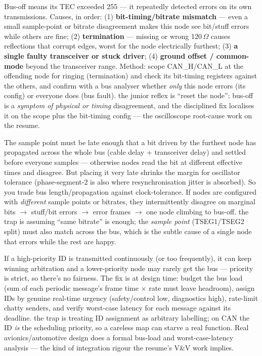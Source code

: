 Bus-off means its TEC exceeded 255 --- it repeatedly detected errors on its own
transmissions. Causes, in order: (1) \textbf{bit-timing/bitrate mismatch} ---
even a small sample-point or bitrate disagreement makes this node see bit/stuff
errors while others are fine; (2) \textbf{termination} --- missing or wrong
120\,$\Omega$ causes reflections that corrupt edges, worst for the node
electrically furthest; (3) \textbf{a single faulty transceiver or stuck
driver}; (4) \textbf{ground offset / common-mode} beyond the transceiver range.
Method: scope CAN\_H/CAN\_L at the offending node for ringing (termination) and
check its bit-timing registers against the others, and confirm with a bus
analyser whether \emph{only} this node errors (its config) or everyone does (bus
fault). \trap the junior reflex is ``reset the node''; bus-off is a \emph{symptom
of physical or timing} disagreement, and the disciplined fix localises it on the
scope plus the bit-timing config --- the oscilloscope root-cause work on the
resume.

The sample point must be late enough that a bit driven by the furthest node has
propagated across the whole bus (cable delay + transceiver delay) and settled
before everyone samples --- otherwise nodes read the bit at different effective
times and disagree. But placing it very late shrinks the margin for oscillator
tolerance (phase-segment-2 is also where resynchronisation jitter is absorbed).
So you trade bus length/propagation against clock-tolerance. If nodes are
configured with \emph{different} sample points or bitrates, they intermittently
disagree on marginal bits $\rightarrow$ stuff/bit errors $\rightarrow$ error
frames $\rightarrow$ one node climbing to bus-off. \trap the trap is assuming
``same bitrate'' is enough; the \emph{sample point} (TSEG1/TSEG2 split) must
also match across the bus, which is the subtle cause of a single node that
errors while the rest are happy.

If a high-priority ID is transmitted continuously (or too frequently), it can
keep winning arbitration and a lower-priority node may rarely get the bus ---
priority is strict, so there's no fairness. The fix is at design time: budget the
bus load (sum of each periodic message's frame time $\times$ rate must leave
headroom), assign IDs by genuine real-time urgency (safety/control low,
diagnostics high), rate-limit chatty senders, and verify worst-case latency for
each message against its deadline. \trap the trap is treating ID assignment as
arbitrary labelling; on CAN the ID \emph{is} the scheduling priority, so a
careless map can starve a real function. Real avionics/automotive design does a
formal bus-load and worst-case-latency analysis --- the kind of integration
rigour the resume's V\&V work implies.

